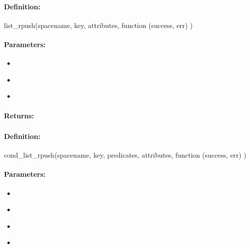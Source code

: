 \paragraph{Definition:}
\begin{javascriptcode}
list_rpush(spacename, key, attributes, function (success, err) {})
\end{javascriptcode}
\paragraph{Parameters:}
\begin{itemize}[noitemsep]
\item {}\\

\item {}\\

\item {}\\

\end{itemize}

\paragraph{Returns:}


\pagebreak
\subsubsection{}
\label{api:nodejs:cond_list_rpush}


\paragraph{Definition:}
\begin{javascriptcode}
cond_list_rpush(spacename, key, predicates, attributes, function (success, err) {})
\end{javascriptcode}
\paragraph{Parameters:}
\begin{itemize}[noitemsep]
\item {}\\

\item {}\\

\item {}\\

\item {}\\

\end{itemize}

